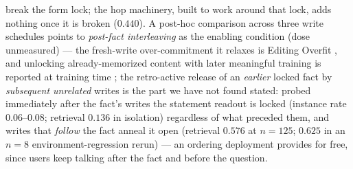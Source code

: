 \documentclass[11pt]{article}
\begin{document}
break the form lock; the hop machinery, built to work around that lock, adds nothing once
it is broken ($0.440$). A post-hoc comparison across three write schedules points to
\emph{post-fact interleaving} as the enabling condition (dose unmeasured) --- the
fresh-write over-commitment it relaxes is Editing Overfit \citep{zhang2025editingoverfit},
and unlocking already-memorized content with later meaningful training is reported at
training time \citep{wu2026rote}; the retro-active release of an \emph{earlier} locked
fact by \emph{subsequent unrelated} writes is the part we have not found stated: probed
immediately after the fact's writes the statement readout is locked (instance rate
$0.06$--$0.08$; retrieval $0.136$ in isolation) regardless of what preceded them, and
writes that \emph{follow} the fact anneal it open (retrieval $0.576$ at $n{=}125$;
$0.625$ in an $n{=}8$ environment-regression rerun) --- an ordering deployment provides
for free, since users keep talking after the fact and before the question.
\end{document}
